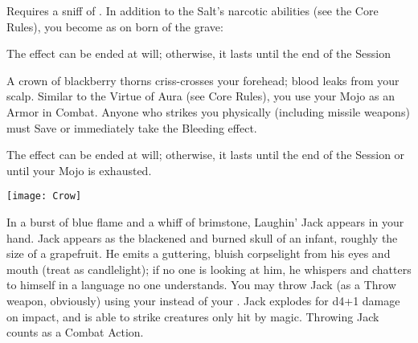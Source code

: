 {

\NECRO[
  Name=Born of the Grave,
  Link=necromancy-born-of-the-grave,
  Paradigm=Death,
  Save=N,
  Duration=Session,
  Target=4
]

Requires a sniff of .  In addition to the Salt's narcotic abilities (see the Core Rules), you become as on born of the grave:


The effect can be ended at will; otherwise, it lasts until the end of the Session

\NECRO[
  Name=Crown of Thorns,
  Link=necromancy-crown-of-thorns,
  Paradigm=Death,
  Save=N,
  Duration=Session (see below),
  Target=5
]

A crown of blackberry thorns criss-crosses your forehead; blood leaks from your scalp.  Similar to the Virtue of Aura (see Core Rules), you use your Mojo as an Armor \UD in Combat.  Anyone who strikes you physically (including missile weapons) must Save or immediately take the Bleeding effect.  

The effect can be ended at will; otherwise, it lasts until the end of the Session or until your Mojo is exhausted.


  \begin{center}
  \texttt{[image: Crow]}
  \end{center}


\NECRO[
  Name=Laughin' Jack,
  Link=necromancy-laughin-jack,
  Paradigm=Death,
  Save=N,
  Duration=0,
  Target=2
]

In a burst of blue flame and a whiff of brimstone, Laughin' Jack appears in your hand.  Jack appears as the blackened and burned skull of an infant, roughly the size of a grapefruit.  He emits a guttering, bluish corpselight from his eyes and mouth (treat as candlelight); if no one is looking at him, he whispers and chatters to himself in a language no one understands.  You may throw Jack (as a Throw weapon, obviously) using your \FOC instead of your \DEX.  Jack explodes for d4+1 damage on impact, and is able to strike creatures only hit by magic.  Throwing Jack counts as a Combat Action.



}
